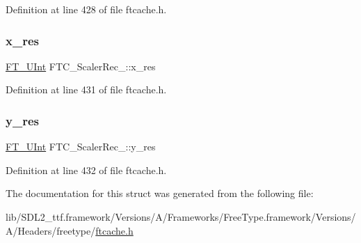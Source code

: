 Definition at line 428 of file ftcache.\+h.

\mbox{\label{struct_f_t_c___scaler_rec___a886c7c1230dc5d5e6b3fc32d06274752}} 
\subsubsection{\texorpdfstring{x\_res}{x\_res}}
{\footnotesize\ttfamily \mbox{\hyperlink{fttypes_8h_abcb8db4dbf35d2b55a9e8c7b0926dc52}{F\+T\+\_\+\+U\+Int}} F\+T\+C\+\_\+\+Scaler\+Rec\+\_\+\+::x\+\_\+res}



Definition at line 431 of file ftcache.\+h.

\mbox{\label{struct_f_t_c___scaler_rec___accb53c7a9aeebb41c05f48d14d3dfe71}} 
\subsubsection{\texorpdfstring{y\_res}{y\_res}}
{\footnotesize\ttfamily \mbox{\hyperlink{fttypes_8h_abcb8db4dbf35d2b55a9e8c7b0926dc52}{F\+T\+\_\+\+U\+Int}} F\+T\+C\+\_\+\+Scaler\+Rec\+\_\+\+::y\+\_\+res}



Definition at line 432 of file ftcache.\+h.



The documentation for this struct was generated from the following file\+:\begin{DoxyCompactItemize}
\item 
lib/\+S\+D\+L2\+\_\+ttf.\+framework/\+Versions/\+A/\+Frameworks/\+Free\+Type.\+framework/\+Versions/\+A/\+Headers/freetype/\mbox{\hyperlink{ftcache_8h}{ftcache.\+h}}\end{DoxyCompactItemize}
